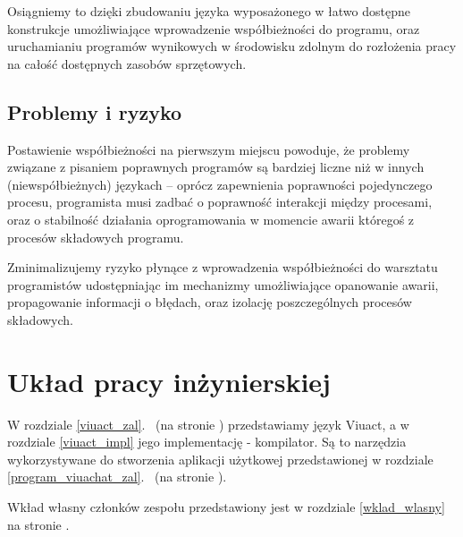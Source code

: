 Osiągniemy to dzięki zbudowaniu języka wyposażonego w łatwo dostępne konstrukcje umożliwiające wprowadzenie
współbieżności do programu, oraz uruchamianiu programów wynikowych w środowisku zdolnym do rozłożenia pracy na
całość dostępnych zasobów sprzętowych.

\subsection{Problemy i ryzyko}

Postawienie współbieżności na pierwszym miejscu powoduje, że problemy związane z pisaniem poprawnych programów
są bardziej liczne niż w innych (niewspółbieżnych) językach -- oprócz zapewnienia poprawności pojedynczego
procesu, programista musi zadbać o poprawność interakcji między procesami, oraz o stabilność działania
oprogramowania w momencie awarii któregoś z procesów składowych programu.

Zminimalizujemy ryzyko płynące z wprowadzenia współbieżności do warsztatu programistów udostępniając im
mechanizmy umożliwiające opanowanie awarii, propagowanie informacji o błędach, oraz izolację poszczególnych
procesów składowych.

\section{Układ pracy inżynierskiej}

W rozdziale \ref{viuact_zal}.~ (na stronie \pageref{viuact_zal}) przedstawiamy język
Viuact, a w rozdziale \ref{viuact_impl} jego implementację - kompilator. Są to narzędzia wykorzystywane do
stworzenia aplikacji użytkowej przedstawionej w rozdziale
\ref{program_viuachat_zal}.~ (na stronie \pageref{program_viuachat_zal}).

Wkład własny członków zespołu przedstawiony jest w rozdziale \ref{wklad_wlasny} na stronie
\pageref{wklad_wlasny}.


